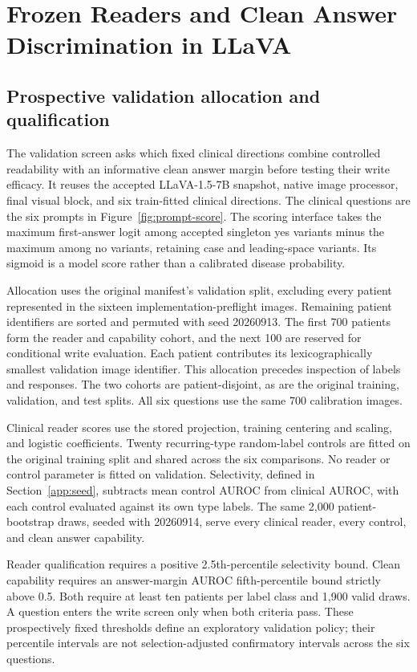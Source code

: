 \clearpage
\section{Frozen Readers and Clean Answer Discrimination in LLaVA}
\label{app:validation-readout}

\subsection{Prospective validation allocation and qualification}

The validation screen asks which fixed clinical directions combine
controlled readability with an informative clean answer margin before
testing their write efficacy. It reuses the accepted LLaVA-1.5-7B snapshot,
native image processor, final visual block, and six train-fitted clinical
directions. The clinical questions are the six prompts in
Figure~\ref{fig:prompt-score}. The scoring interface takes the maximum
first-answer logit among accepted singleton yes variants minus the maximum
among no variants, retaining case and leading-space variants. Its sigmoid
is a model score rather than a calibrated disease probability.

Allocation uses the original manifest's validation split, excluding every
patient represented in the sixteen implementation-preflight images.
Remaining patient identifiers are sorted and permuted with seed 20260913.
The first 700 patients form the reader and capability cohort, and the next
100 are reserved for conditional write evaluation. Each patient contributes
its lexicographically smallest validation image identifier. This allocation
precedes inspection of labels and responses. The two cohorts are
patient-disjoint, as are the original training, validation, and test splits.
All six questions use the same 700 calibration images.

Clinical reader scores use the stored projection, training centering and
scaling, and logistic coefficients. Twenty recurring-type random-label
controls are fitted on the original training split and shared across the
six comparisons. No reader or control parameter is fitted on validation.
Selectivity, defined in Section~\ref{app:seed}, subtracts mean control
AUROC from clinical AUROC, with each control evaluated against its own type
labels. The same 2,000 patient-bootstrap draws, seeded with 20260914, serve
every clinical reader, every control, and clean answer capability.

Reader qualification requires a positive 2.5th-percentile selectivity bound.
Clean capability requires an answer-margin AUROC fifth-percentile bound
strictly above 0.5. Both require at least ten patients per label class and
1,900 valid draws. A question enters the write screen only when both
criteria pass. These prospectively fixed thresholds define an exploratory
validation policy; their percentile intervals are not selection-adjusted
confirmatory intervals across the six questions.

